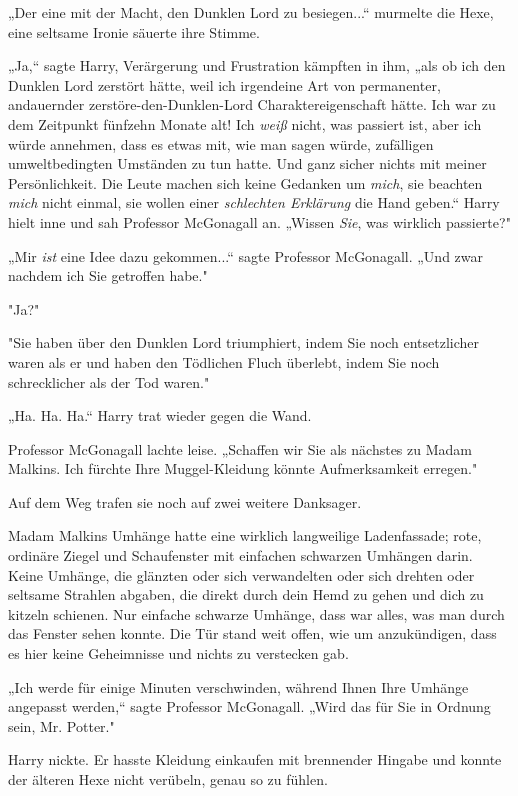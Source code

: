 {„Der eine mit der Macht, den Dunklen Lord zu besiegen...“ murmelte die Hexe, eine seltsame Ironie säuerte ihre Stimme.

„Ja,“ sagte Harry, Verärgerung und Frustration kämpften in ihm, „als ob ich den Dunklen Lord zerstört hätte, weil ich irgendeine Art von permanenter, andauernder zerstöre-den-Dunklen-Lord Charaktereigenschaft hätte. Ich war zu dem Zeitpunkt fünfzehn Monate alt! Ich \emph{weiß} nicht, was passiert ist, aber ich würde annehmen, dass es etwas mit, wie man sagen würde, zufälligen umweltbedingten Umständen zu tun hatte. Und ganz sicher nichts mit meiner Persönlichkeit. Die Leute machen sich keine Gedanken um \emph{mich}, sie beachten \emph{mich} nicht einmal, sie wollen einer \emph{schlechten Erklärung} die Hand geben.“ Harry hielt inne und sah Professor McGonagall an. „Wissen \emph{Sie}, was wirklich passierte?"

„Mir \emph{ist} eine Idee dazu gekommen...“ sagte Professor McGonagall. „Und zwar nachdem ich Sie getroffen habe."

"Ja?"

"Sie haben über den Dunklen Lord triumphiert, indem Sie noch entsetzlicher waren als er und haben den Tödlichen Fluch überlebt, indem Sie noch schrecklicher als der Tod waren."

„Ha. Ha. Ha.“ Harry trat wieder gegen die Wand.

Professor McGonagall lachte leise. „Schaffen wir Sie als nächstes zu Madam Malkins. Ich fürchte Ihre Muggel-Kleidung könnte Aufmerksamkeit erregen."

Auf dem Weg trafen sie noch auf zwei weitere Danksager.

Madam Malkins Umhänge hatte eine wirklich langweilige Ladenfassade; rote, ordinäre Ziegel und Schaufenster mit einfachen schwarzen Umhängen darin. Keine Umhänge, die glänzten oder sich verwandelten oder sich drehten oder seltsame Strahlen abgaben, die direkt durch dein Hemd zu gehen und dich zu kitzeln schienen. Nur einfache schwarze Umhänge, dass war alles, was man durch das Fenster sehen konnte. Die Tür stand weit offen, wie um anzukündigen, dass es hier keine Geheimnisse und nichts zu verstecken gab.

„Ich werde für einige Minuten verschwinden, während Ihnen Ihre Umhänge angepasst werden,“ sagte Professor McGonagall. „Wird das für Sie in Ordnung sein, Mr. Potter."

Harry nickte. Er hasste Kleidung einkaufen mit brennender Hingabe und konnte der älteren Hexe nicht verübeln, genau so zu fühlen.

}
